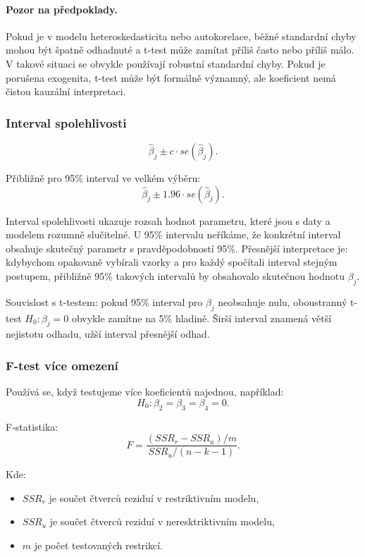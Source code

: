 \paragraph{Pozor na předpoklady.}
Pokud je v modelu heteroskedasticita nebo autokorelace, běžné standardní chyby mohou být špatně odhadnuté
a t-test může zamítat příliš často nebo příliš málo. V takové situaci se obvykle používají robustní
standardní chyby. Pokud je porušena exogenita, t-test může být formálně významný, ale koeficient nemá
čistou kauzální interpretaci.

\subsubsection{Interval spolehlivosti}

\[
\hat\beta_j \pm c \cdot se(\hat\beta_j).
\]

Přibližně pro 95\% interval ve velkém výběru:
\[
\hat\beta_j \pm 1.96 \cdot se(\hat\beta_j).
\]

Interval spolehlivosti ukazuje rozsah hodnot parametru, které jsou s daty a modelem rozumně slučitelné.
U 95\% intervalu neříkáme, že konkrétní interval obsahuje skutečný parametr s pravděpodobností 95\%.
Přesnější interpretace je: kdybychom opakovaně vybírali vzorky a pro každý spočítali interval stejným
postupem, přibližně 95\% takových intervalů by obsahovalo skutečnou hodnotu \(\beta_j\).

Souvislost s t-testem: pokud 95\% interval pro \(\beta_j\) neobsahuje nulu, oboustranný t-test
\(H_0:\beta_j=0\) obvykle zamítne na 5\% hladině. Širší interval znamená větší nejistotu odhadu,
užší interval přesnější odhad.

\subsubsection{F-test více omezení}

Používá se, když testujeme více koeficientů najednou, například:
\[
H_0:\beta_2=\beta_3=\beta_4=0.
\]

F-statistika:
\[
F=
\frac{(SSR_r-SSR_u)/m}{SSR_u/(n-k-1)}.
\]

Kde:
\begin{itemize}
    \item $SSR_r$ je součet čtverců reziduí v restriktivním modelu,
    \item $SSR_u$ je součet čtverců reziduí v neresktriktivním modelu,
    \item $m$ je počet testovaných restrikcí.
\end{itemize}

